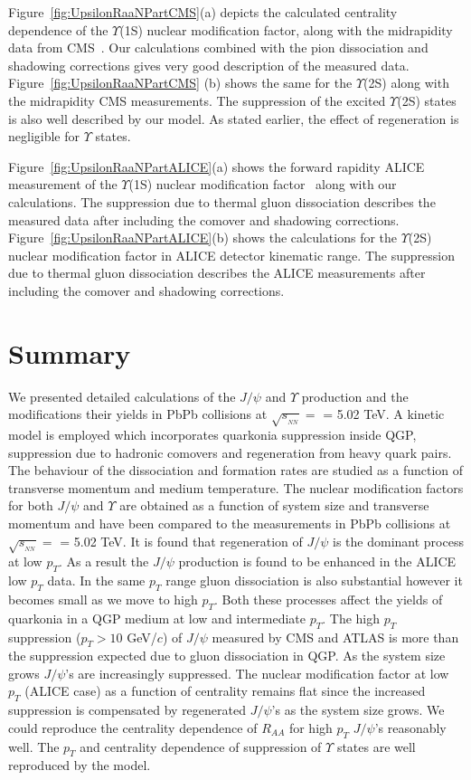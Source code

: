 \documentclass[12pt,a4paper,final]{iopart} %
\newcommand{\Jpsi}{J/\psi}
\newcommand{\pT}{p_{T}}
\newcommand{\sNN}{\sqrt{s_{_{NN}}}}
\begin{document}
Figure~\ref{fig:UpsilonRaaNPartCMS}(a) depicts the calculated 
centrality dependence of the $\Upsilon$(1S) nuclear
modification factor, along with the midrapidity data from CMS~\cite{CMS:2017ucd}.
Our calculations combined with the pion dissociation and shadowing corrections 
gives very good description of the measured data. Figure~\ref{fig:UpsilonRaaNPartCMS} (b)
shows the same for the $\Upsilon$(2S) along with the midrapidity
CMS measurements. The suppression of the excited $\Upsilon$(2S) states 
is also well described by our model. As stated earlier, the effect of regeneration is
negligible for $\Upsilon$ states. 

Figure~\ref{fig:UpsilonRaaNPartALICE}(a) shows the forward rapidity ALICE
measurement of the $\Upsilon$(1S) nuclear modification factor~\cite{ALICE:Y5TeV}
along with our calculations. The suppression due to thermal gluon dissociation 
describes the measured data after including the comover and shadowing corrections.
Figure~\ref{fig:UpsilonRaaNPartALICE}(b) shows the calculations for the
$\Upsilon$(2S) nuclear modification factor in ALICE detector kinematic range.
The suppression due to thermal gluon dissociation describes the
ALICE measurements after including the comover and shadowing corrections.


\section{Summary}
 We presented detailed calculations of the $\Jpsi$ and $\Upsilon$ 
production and the modifications their yields in PbPb collisions at $\sNN =$ = 5.02 TeV.
A kinetic model is employed which incorporates quarkonia suppression inside QGP, suppression 
due to hadronic comovers and regeneration from heavy quark pairs.
The behaviour of the dissociation and formation rates are studied as a function of
transverse momentum and medium temperature. 
The nuclear modification factors for both $\Jpsi$ and $\Upsilon$ are obtained 
as a function of system size and transverse momentum and have been compared to the measurements
in PbPb collisions at $\sNN =$ = 5.02 TeV.
It is found that  regeneration of $\Jpsi$ is the dominant process at low $p_T$. As a result the $\Jpsi$ production 
is found to be enhanced in the ALICE low $p_T$ data.
In the same $p_T$ range gluon dissociation is also substantial however it becomes small
as we move to high $p_T$. 
 Both  these processes affect the 
yields of quarkonia in a QGP medium  at low and intermediate $p_T$. The high $p_T$ 
suppression ($p_T > 10$  GeV/$c$) of $\Jpsi$ measured by CMS and ATLAS is more than
the suppression expected due to gluon dissociation in QGP.
As the system size grows  $\Jpsi$'s are increasingly suppressed.  The nuclear 
modification factor at low $p_T$  (ALICE case) as a function of centrality remains
flat since the increased suppression is compensated by regenerated  $\Jpsi$'s
as the system size grows. 
We could reproduce the centrality dependence of $R_{AA}$ for high $p_T$ $\Jpsi$'s reasonably
well. 
 The $\pT$ and centrality dependence of suppression of $\Upsilon$ states are well reproduced
by the model.
 
\end{document}

